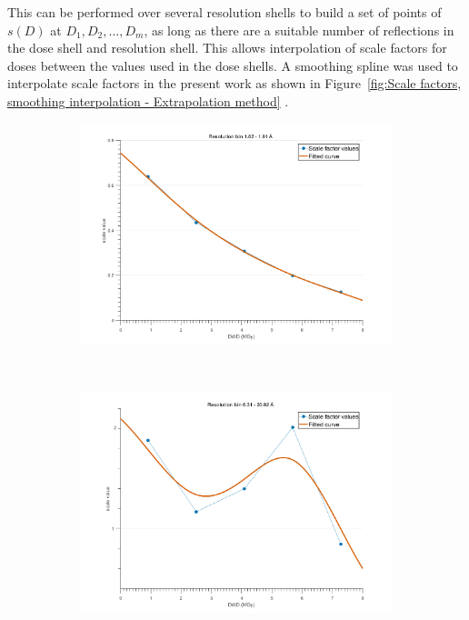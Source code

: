 This can be performed over several resolution shells to build a set of points of $s(D)$ at $D_1, D_2,\ldots, D_m$, as long as there are a suitable number of reflections in the dose shell and resolution shell.
This allows interpolation of scale factors for doses between the values used in the dose shells.
A smoothing spline was used to interpolate scale factors in the present work as shown in Figure~\ref{fig:Scale factors, smoothing interpolation - Extrapolation method} .
\begin{figure}
        \centering
        \begin{subfigure}[b]{1\textwidth}
                \centering
                \includegraphics[width=\textwidth]{figures/zde/scale_fit_bin12.pdf}
                \caption{}
                \label{fig:monotonic scale factor - Extrapolation method}
        \end{subfigure}
				\\
        \begin{subfigure}[b]{1\textwidth}
                \centering
                \includegraphics[width=\textwidth]{figures/zde/scale_fit_bin1.pdf}

\end{subfigure}
\end{figure}
